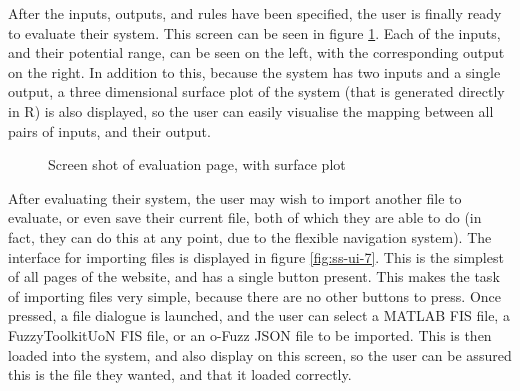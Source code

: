 \noindent
After the inputs, outputs, and rules have been specified, the user is finally ready to evaluate their system. This screen can be seen in figure \ref{fig:ss-ui-9}. Each of the inputs, and their potential range, can be seen on the left, with the corresponding output on the right. In addition to this, because the system has two inputs and a single output, a three dimensional surface plot of the system (that is generated directly in R) is also displayed, so the user can easily visualise the mapping between all pairs of inputs, and their output.
\begin{figure}[ht!]
	\begin{center}
	\end{center}
	\vspace{-6mm}
	\caption{Screen shot of evaluation page, with surface plot}
	\label{fig:ss-ui-9}
	\vspace{-3mm}
\end{figure}


\noindent
After evaluating their system, the user may wish to import another file to evaluate, or even save their current file, both of which they are able to do (in fact, they can do this at any point, due to the flexible navigation system). The interface for importing files is displayed in figure \ref{fig:ss-ui-7}. This is the simplest of all pages of the website, and has a single button present. This makes the task of importing files very simple, because there are no other buttons to press. Once pressed, a file dialogue is launched, and the user can select a MATLAB FIS file, a FuzzyToolkitUoN FIS file, or an o-Fuzz JSON file to be imported. This is then loaded into the system, and also display on this screen, so the user can be assured this is the file they wanted, and that it loaded correctly.

